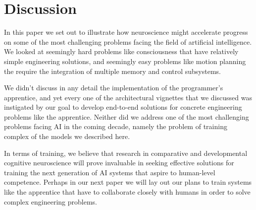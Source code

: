 \section*{Discussion}

In this paper we set out to illustrate how neuroscience might accelerate progress on some of the most challenging problems facing the field of artificial intelligence. We looked at seemingly hard problems like consciousness that have relatively simple engineering solutions, and seemingly easy problems like motion planning the require the integration of multiple memory and control subsystems.

We didn't discuss in any detail the implementation of the programmer's apprentice, and yet every one of the architectural vignettes that we discussed was instigated by our goal to develop end-to-end solutions for concrete engineering problems like the apprentice. Neither did we address one of the most challenging problems facing AI in the coming decade, namely the problem of training complex of the models we described here.

In terms of training, we believe that research in comparative and developmental cognitive neuroscience will prove invaluable in seeking effective solutions for training the next generation of AI systems that aspire to human-level competence. Perhaps in our next paper we will lay out our plans to train systems like the apprentice that have to collaborate closely with humans in order to solve complex engineering problems. 

